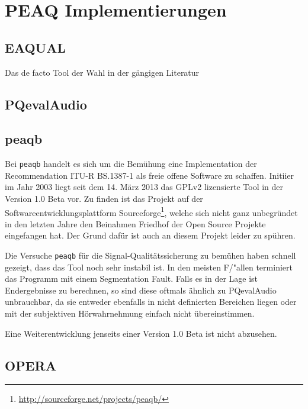 \chapter{PEAQ Implementierungen}
\label{ch:peaq}

\section{EAQUAL}

Das de facto Tool der Wahl in der gängigen Literatur \cite{xiang2007robust}\cite{kraetzer2006transparency}

\section{PQevalAudio}

\section{peaqb}

Bei \texttt{peaqb} handelt es sich um die Bemühung eine Implementation der Recommendation ITU-R BS.1387-1 als freie offene Software zu schaffen. Initiier im Jahr 2003 liegt seit dem 14. März 2013 das GPLv2 lizensierte Tool in der Version 1.0 Beta vor. Zu finden ist das Projekt auf der Softwareentwicklungsplattform Sourceforge\footnote{\url{http://sourceforge.net/projects/peaqb/}}, welche sich nicht ganz unbegr\"undet in den letzten Jahre den Beinahmen \glqq Friedhof der Open Source Projekte\grqq{} eingefangen hat. Der Grund daf\"ur ist auch an diesem Projekt leider zu sp\"uhren. 

Die Versuche \texttt{peaqb} für die Signal-Qualitätssicherung zu bem\"uhen haben schnell gezeigt, dass das Tool noch sehr instabil ist. In den meisten F/"allen terminiert das Programm mit einem Segmentation Fault. Falls es in der Lage ist Endergebnisse zu berechnen, so sind diese oftmals ähnlich zu PQevalAudio unbrauchbar, da sie entweder ebenfalls in nicht definierten Bereichen liegen oder mit der subjektiven H\"orwahrnehmung einfach nicht \"ubereinstimmen. 

Eine Weiterentwicklung jenseits einer Version 1.0 Beta ist nicht abzusehen. 

\section{OPERA}





